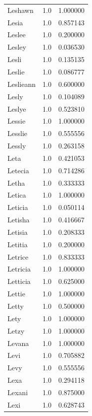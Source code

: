 \documentclass[
  letterpaper,
  DIV=11,
  numbers=noendperiod]{scrreprt}
\begin{document}
\begin{tabular}{lrr}
Leshawn         &   1.0 &   1.000000 \\
Lesia           &   1.0 &   0.857143 \\
Leslee          &   1.0 &   0.200000 \\
Lesley          &   1.0 &   0.036530 \\
Lesli           &   1.0 &   0.135135 \\
Leslie          &   1.0 &   0.086777 \\
Leslieann       &   1.0 &   0.600000 \\
Lesly           &   1.0 &   0.104089 \\
Leslye          &   1.0 &   0.523810 \\
Lessie          &   1.0 &   1.000000 \\
Lesslie         &   1.0 &   0.555556 \\
Lessly          &   1.0 &   0.263158 \\
Leta            &   1.0 &   0.421053 \\
Letecia         &   1.0 &   0.714286 \\
Letha           &   1.0 &   0.333333 \\
Letica          &   1.0 &   1.000000 \\
Leticia         &   1.0 &   0.050114 \\
Letisha         &   1.0 &   0.416667 \\
Letisia         &   1.0 &   0.208333 \\
Letitia         &   1.0 &   0.200000 \\
Letrice         &   1.0 &   0.833333 \\
Letricia        &   1.0 &   1.000000 \\
Letticia        &   1.0 &   0.625000 \\
Lettie          &   1.0 &   1.000000 \\
Letty           &   1.0 &   0.500000 \\
Lety            &   1.0 &   1.000000 \\
Letzy           &   1.0 &   1.000000 \\
Levana          &   1.0 &   1.000000 \\
Levi            &   1.0 &   0.705882 \\
Levy            &   1.0 &   0.555556 \\
Lexa            &   1.0 &   0.294118 \\
Lexani          &   1.0 &   0.875000 \\
Lexi            &   1.0 &   0.628743 \\

\end{tabular}
\end{document}
